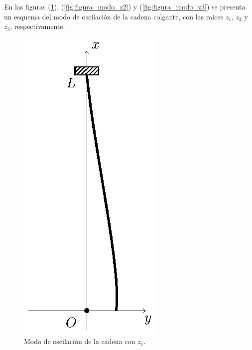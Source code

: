En las figuras (\ref{fig:figura_modo_z1}), (\ref{fig:figura_modo_z2}) y (\ref{fig:figura_modo_z3}) se presenta un esquema del modo de oscilación de la cadena colgante, con las raíces $z_{1}$, $z_{2}$ y $z_{3}$, respectivamente.
\begin{figure}[H]
    \centering
    \includegraphics[scale=1]{Imagenes/Cadena_Oscilante_03.eps}
    \caption{Modo de oscilación de la cadena con $z_{1}$.}
    \label{fig:figura_modo_z1}
\end{figure}

